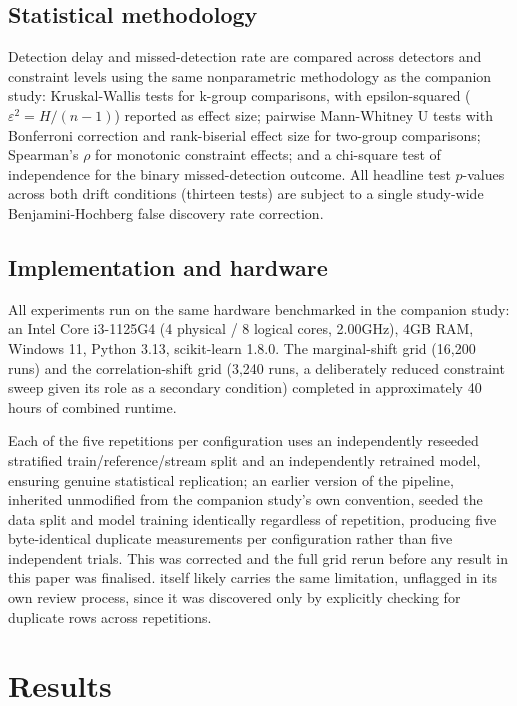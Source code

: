 \documentclass[conference]{IEEEtran}
\begin{document}
\subsection{Statistical methodology}

Detection delay and missed-detection rate are compared across detectors and constraint levels using the same nonparametric methodology as the companion study: Kruskal-Wallis tests for k-group comparisons, with epsilon-squared ($\varepsilon^2 = H / (n-1)$) reported as effect size; pairwise Mann-Whitney U tests with Bonferroni correction and rank-biserial effect size for two-group comparisons; Spearman's $\rho$ for monotonic constraint effects; and a chi-square test of independence for the binary missed-detection outcome. All headline test $p$-values across both drift conditions (thirteen tests) are subject to a single study-wide Benjamini-Hochberg false discovery rate correction.

\subsection{Implementation and hardware}

All experiments run on the same hardware benchmarked in the companion study: an Intel Core i3-1125G4 (4 physical / 8 logical cores, 2.00GHz), 4GB RAM, Windows 11, Python 3.13, scikit-learn 1.8.0. The marginal-shift grid (16,200 runs) and the correlation-shift grid (3,240 runs, a deliberately reduced constraint sweep given its role as a secondary condition) completed in approximately 40 hours of combined runtime.

Each of the five repetitions per configuration uses an independently reseeded stratified train/reference/stream split and an independently retrained model, ensuring genuine statistical replication; an earlier version of the pipeline, inherited unmodified from the companion study's own convention, seeded the data split and model training identically regardless of repetition, producing five byte-identical duplicate measurements per configuration rather than five independent trials. This was corrected and the full grid rerun before any result in this paper was finalised. \cite{paper1self} itself likely carries the same limitation, unflagged in its own review process, since it was discovered only by explicitly checking for duplicate rows across repetitions.

\section{Results}
\end{document}
